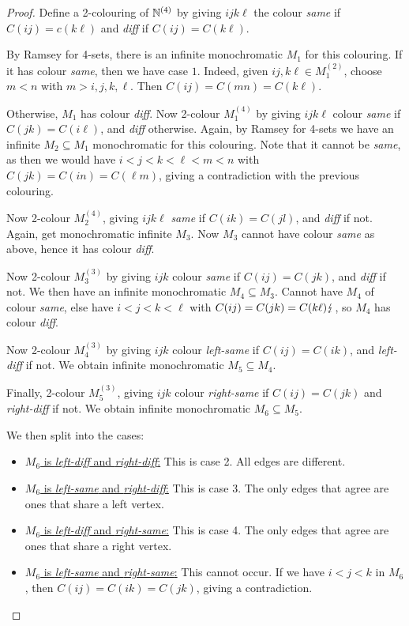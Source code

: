 \documentclass[10pt,a4paper]{article}
\begin{document}
\begin{proof}
  Define a 2-colouring of $\mathbb{N}^{(4)}$ by giving $ijk\ell$ the colour \textit{same} if $C(ij) = c(k\ell)$ and \textit{diff} if $C(ij) = C(k\ell)$.

  By Ramsey for 4-sets, there is an infinite monochromatic $M_1$ for this colouring. If it has colour \textit{same}, then we have case $1$. Indeed, given $ij, k\ell \in M_1^{(2)}$, choose $m<n$ with $m>i,j,k,\ell$. Then $C(ij) = C(mn) = C(k\ell)$.

  Otherwise, $M_1$ has colour \textit{diff}. Now 2-colour $M_1^{(4)}$ by giving $ijk\ell$ colour \textit{same} if $C(jk) = C(i\ell)$, and \textit{diff} otherwise. Again, by Ramsey for 4-sets we have an infinite $M_2\subseteq M_1$ monochromatic for this colouring. Note that it cannot be \textit{same}, as then we would have $i<j<k<\ell<m<n$ with $C(jk) = C(in) = C(\ell m)$, giving a contradiction with the previous colouring.

  Now 2-colour $M_2^{(4)}$, giving $ijk\ell$ \textit{same} if $C(ik) = C(jl)$, and \textit{diff} if not. Again, get monochromatic infinite $M_3$. Now $M_3$ cannot have colour \textit{same} as above, hence it has colour \textit{diff}.

  Now 2-colour $M_3^{(3)}$ by giving $ijk$ colour \textit{same} if $C(ij)=C(jk)$, and \textit{diff} if not. We then have an infinite monochromatic $M_4 \subseteq M_3$. Cannot have $M_4$ of colour \textit{same}, else have $i<j<k<\ell$ with $C(ij) = C(jk) = C(k\ell)\lightning$, so $M_4$ has colour \textit{diff}.

  Now 2-colour $M_4^{(3)}$ by giving $ijk$ colour \textit{left-same} if $C(ij) = C(ik)$, and \textit{left-diff} if not. We obtain infinite monochromatic $M_5 \subseteq M_4$.

  Finally, 2-colour $M_5^{(3)}$, giving $ijk$ colour \textit{right-same} if $C(ij) = C(jk)$ and \textit{right-diff} if not. We obtain infinite monochromatic $M_6\subseteq M_5$.

  We then split into the cases:
  \begin{itemize}
    \item \underline{$M_6$ is \textit{left-diff} and \textit{right-diff}:} This is case 2. All edges are different.
    \item \underline{$M_6$ is \textit{left-same} and \textit{right-diff}:} This is case 3. The only edges that agree are ones that share a left vertex.
    \item \underline{$M_6$ is \textit{left-diff} and \textit{right-same}:} This is case 4. The only edges that agree are ones that share a right vertex.
    \item \underline{$M_6$ is \textit{left-same} and \textit{right-same}:} This cannot occur. If we have $i<j<k$ in $M_6$, then $C(ij) = C(ik) = C(jk)$, giving a contradiction.
  \end{itemize}
\end{proof}
\end{document}

